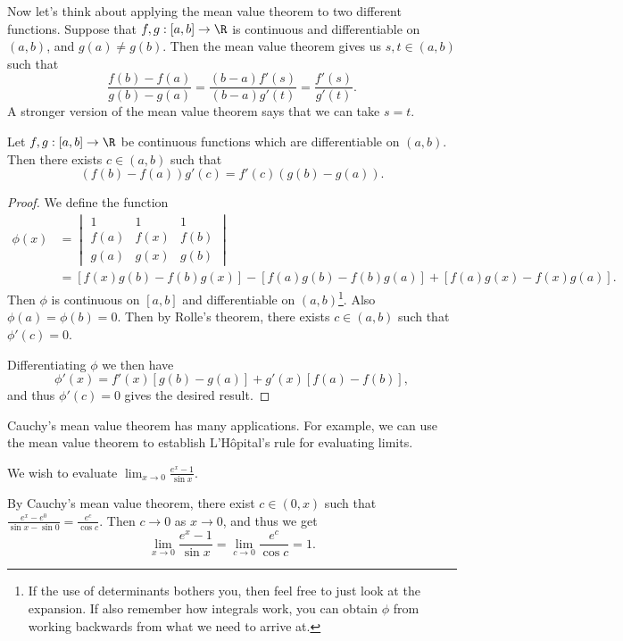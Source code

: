 \documentclass[a4paper]{scrartcl}
\begin{document}
Now let's think about applying the mean value theorem to two different functions. Suppose that $f, g : [a, b] \rightarrow \R$ is continuous and differentiable on $(a, b)$, and $g(a) \neq g(b)$. Then the mean value theorem gives us $s, t \in (a, b)$ such that
$$
	\frac{f(b) - f(a)}{g(b) - g(a)} = \frac{(b - a)f'(s)}{(b - a)g'(t)} = \frac{f'(s)}{g'(t)}.
$$
A stronger version of the mean value theorem says that we can take $s = t$.

\begin{theorem}
	Let $f, g : [a, b] \rightarrow \R$ be continuous functions which are differentiable on $(a, b)$. Then there exists $c \in (a, b)$ such that
	$$
	(f(b) - f(a))g'(c) = f'(c)(g(b) - g(a)).
	$$
\end{theorem}
\begin{proof}
	We define the function
	\begin{align*}
		\phi(x) &= \begin{vmatrix}
			1 & 1 & 1 \\
			f(a) & f(x) & f(b) \\
			g(a) & g(x) & g(b)
			\end{vmatrix}  \\
		&= \left[f(x)g(b) - f(b)g(x)\right] - [f(a)g(b) - f(b) g(a)] + [f(a) g(x) - f(x) g(a)].
	\end{align*}
	Then $\phi$ is continuous on $[a, b]$ and differentiable on $(a, b)$\footnote{If the use of determinants bothers you, then feel free to just look at the expansion. If also remember how integrals work, you can obtain $\phi$ from working backwards from what we need to arrive at.}. Also $\phi(a) =\phi(b) = 0$. Then by Rolle's theorem, there exists $c \in (a, b)$ such that $\phi'(c) = 0$.
	
	Differentiating $\phi$ we then have 
	$$
	\phi'(x) = f'(x)[g(b) - g(a)] + g'(x)[f(a) - f(b)],
	$$
	and thus $\phi'(c) = 0$ gives the desired result.
\end{proof}

Cauchy's mean value theorem has many applications. For example, we can use the mean value theorem to establish L'Hôpital's rule for evaluating limits.

\begin{example}
	We wish to evaluate $\displaystyle \lim_{x \to 0} \frac{e^x - 1}{\sin x}$.

	By Cauchy's mean value theorem, there exist $c \in (0, x)$ such that
	$
	\frac{e^x - e^0}{\sin x - \sin 0} = \frac{e^c}{\cos c}.
	$
	Then $c \rightarrow 0$ as $x \rightarrow 0$, and thus we get
	$$
	\lim_{x \to 0} \frac{e^x - 1}{\sin x} = \lim_{c \to 0}\frac{e^c}{\cos c} = 1.
	$$
\end{example}
\end{document}
